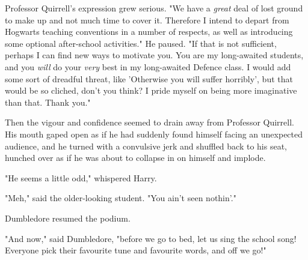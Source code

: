 Professor Quirrell's expression grew serious. "We have a \emph{great} deal of 
lost ground to make up and not much time to cover it. Therefore I intend to 
depart from Hogwarts teaching conventions in a number of respects, as well as 
introducing some optional after-school activities." He paused. "If that is not 
sufficient, perhaps I can find new ways to motivate you. You are my 
long-awaited students, and you \emph{will} do your \emph{very} best in my 
long-awaited Defence class. I would add some sort of dreadful threat, like 
'Otherwise you will suffer horribly', but that would be so cliched, don't you 
think? I pride myself on being more imaginative than that. Thank you."

Then the vigour and confidence seemed to drain away from Professor Quirrell. 
His mouth gaped open as if he had suddenly found himself facing an unexpected 
audience, and he turned with a convulsive jerk and shuffled back to his seat, 
hunched over as if he was about to collapse in on himself and implode.

"He seems a little odd," whispered Harry.

"Meh," said the older-looking student. "You ain't seen nothin'."

Dumbledore resumed the podium.

"And now," said Dumbledore, "before we go to bed, let us sing the school song! 
Everyone pick their favourite tune and favourite words, and off we go!"